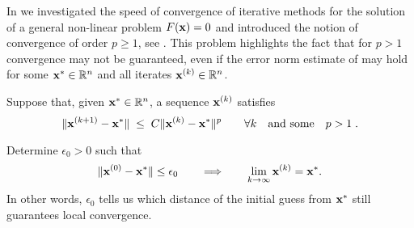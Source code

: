 \renewcommand{\chpt}{ch_iterativenonlinear} 

\begin{problem} \label{prb:ord_p_conv_iter}
  In  we investigated the speed of convergence of
  iterative methods for the solution of a general non-linear problem $F({\mathbf{x}}) = 0$
  and introduced the notion of convergence of order $p \geq 1$, see .
  This problem highlights the fact that for $p>1$ convergence may not be guaranteed,
  even if the error norm estimate of  may hold for some
  ${\mathbf{x}}^{\ast}\in \mathbb{R}^{n}$ and all iterates ${\mathbf{x}}^{(k)}\in\mathbb{R}^{n}$. 

  Suppose that, given ${\mathbf{x}}^{\ast}\in\mathbb{R}^{n}$, a sequence ${\mathbf{x}}^{(k)}$ satisfies
  $$\Vert {\mathbf{x}}^{(k+1)}-{\mathbf{x}}^*\Vert\;\le\; C\Vert {\mathbf{x}}^{(k)}-{\mathbf{x}}^*\Vert^p \qquad \forall k\quad
  \text{and some}\quad p>1\;. $$
  \begin{subproblem}[3]
    Determine $\epsilon_0>0$ such that 
    $$\Vert {\mathbf{x}}^{(0)}-{\mathbf{x}}^*\Vert \le \epsilon_0 \qquad \Longrightarrow \qquad
    \lim\limits_{k\rightarrow \infty} {\mathbf{x}}^{(k)}={\mathbf{x}}^*.$$
    In other words, $\epsilon_{0}$ tells us which distance of the initial guess from 
    ${\mathbf{x}}^{\ast}$ still guarantees local convergence. 
    

\end{subproblem}
\end{problem}
